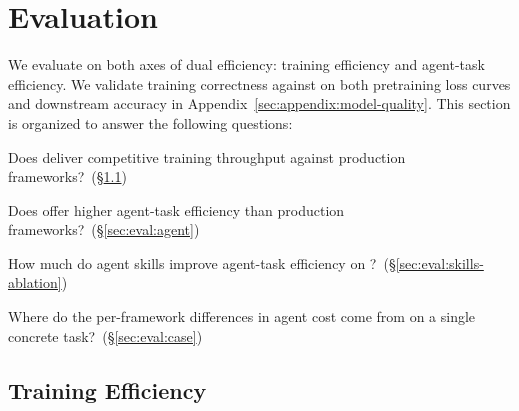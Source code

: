 \section{Evaluation}
\label{sec:evaluation}

We evaluate \sys on both axes of dual efficiency: training
efficiency and agent-task efficiency. We validate training
correctness against \megatron on both pretraining loss curves and
downstream accuracy in
Appendix~\ref{sec:appendix:model-quality}.
This section is organized to answer the following questions:
\squishlist
  \vspace{-2pt}
  \item Does \sys deliver competitive training throughput against production frameworks?~(\S\ref{sec:eval:training})
  \vspace{-2pt}
  \item Does \sys offer higher agent-task efficiency than production frameworks?~(\S\ref{sec:eval:agent})
  \vspace{-2pt}
  \item How much do agent skills improve agent-task efficiency on \sys?~(\S\ref{sec:eval:skills-ablation})
  \vspace{-2pt}
  \item Where do the per-framework differences in agent cost come from
  on a single concrete task?~(\S\ref{sec:eval:case})
  \vspace{-2pt}
\squishend

\subsection{Training Efficiency}
\label{sec:eval:training}







